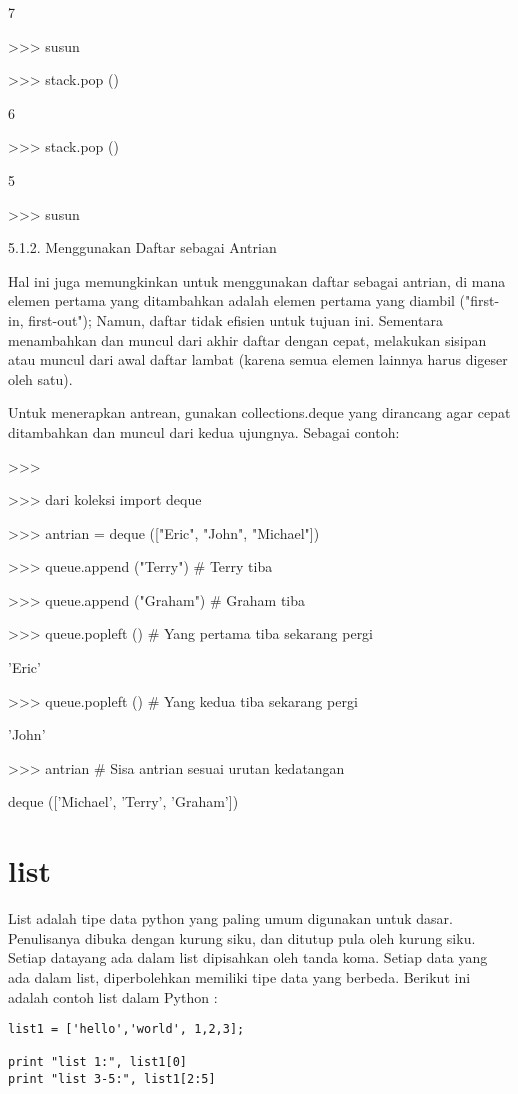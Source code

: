 7 \par
>>> susun \par
[3, 4, 5, 6] \par
>>> stack.pop () \par
6 \par
>>> stack.pop () \par
5 \par
>>> susun \par
[3, 4] \par
\vspace{12pt}
5.1.2. Menggunakan Daftar sebagai Antrian \par
\vspace{12pt}
Hal ini juga memungkinkan untuk menggunakan daftar sebagai antrian, di mana elemen pertama yang ditambahkan adalah elemen pertama yang diambil ("first-in, first-out"); Namun, daftar tidak efisien untuk tujuan ini. Sementara menambahkan dan muncul dari akhir daftar dengan cepat, melakukan sisipan atau muncul dari awal daftar lambat (karena semua elemen lainnya harus digeser oleh satu). \par
\vspace{12pt}
Untuk menerapkan antrean, gunakan collections.deque yang dirancang agar cepat ditambahkan dan muncul dari kedua ujungnya. Sebagai contoh: \par
>>> \par
\vspace{12pt}
>>> dari koleksi import deque \par
>>> antrian = deque (["Eric", "John", "Michael"]) \par
>>> queue.append ("Terry")    \#   Terry tiba \par
>>> queue.append ("Graham")    \#   Graham tiba \par
>>> queue.popleft ()    \#   Yang pertama tiba sekarang pergi \par
'Eric' \par
>>> queue.popleft ()    \#   Yang kedua tiba sekarang pergi \par
'John' \par
>>> antrian    \#   Sisa antrian sesuai urutan kedatangan \par
deque (['Michael', 'Terry', 'Graham']) \par
\vspace{12pt}

\section {list}
List adalah tipe data python yang paling umum digunakan untuk dasar. 
Penulisanya dibuka dengan kurung siku, dan ditutup pula oleh kurung siku. Setiap datayang  ada dalam list dipisahkan oleh tanda koma. 
Setiap data yang ada dalam list, diperbolehkan memiliki tipe data yang berbeda. Berikut ini adalah contoh list dalam Python :

\begin {verbatim}
list1 = ['hello','world', 1,2,3];

print "list 1:", list1[0]
print "list 3-5:", list1[2:5]
\end {verbatim}
